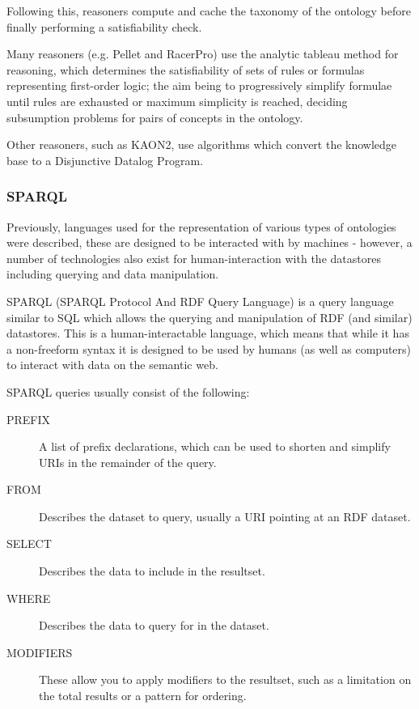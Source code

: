 \documentclass{article}
\begin{document}
Following this, reasoners compute and cache the taxonomy of the ontology before 
finally performing a satisfiability check.

Many reasoners (e.g. Pellet and RacerPro) use the analytic
tableau\cite{tableau} method for
reasoning, which determines the satisfiability of sets of rules or formulas
representing first-order logic; the aim being to progressively simplify formulae
until rules are exhausted or maximum simplicity is reached, deciding subsumption
problems for pairs of concepts in the ontology.

Other reasoners, such as KAON2, use algorithms which convert the knowledge base 
to a Disjunctive Datalog Program.\cite{ddp}

\subsubsection{SPARQL}

Previously, languages used for the representation of various types of ontologies
were described, these are designed to be interacted with by machines - however,
a number of technologies also exist for human-interaction with the datastores
including querying and data manipulation.

SPARQL\cite{sparql} (SPARQL Protocol And RDF Query Language) is a query language similar to
SQL which allows the querying and manipulation of RDF (and similar) datastores.
This is a human-interactable language, which means that while it has a
non-freeform syntax it is designed to be used by humans (as well as computers)
to interact with data on the semantic web.

SPARQL queries usually consist of the following\cite{sparqlquerying}:

\begin{description}
    \item[PREFIX] A list of prefix declarations, which can be used to shorten
    and simplify URIs in the remainder of the query.
    \item[FROM] Describes the dataset to query, usually a URI pointing at an RDF
    dataset.
    \item[SELECT] Describes the data to include in the resultset.
    \item[WHERE] Describes the data to query for in the dataset.
    \item[MODIFIERS] These allow you to apply modifiers to the resultset, such
    as a limitation on the total results or a pattern for ordering.
\end{description}
\end{document}
